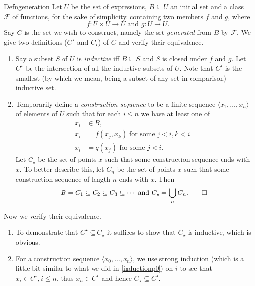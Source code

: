 \begin{reference}{Defn}{generation}
  Let $U$ be the set of expressions, $B\subseteq U$ an initial set and a class $\mathcal{F}$ of functions, for the sake of simplicity, containing two members $f$ and $g$, where
  \[
    f:U\times U\rightarrow U \text{ and } g:U\rightarrow U.
  \]
  Say $C$ is the set we wish to construct, namely the set \textit{generated} from $B$ by $\mathcal{F}$. We give two definitions ($C^\star$ and $C_\star$) of $C$ and verify their equivalence.
  \begin{enumerate}
    \item
          Say a subset $S$ of $U$ is \textit{inductive} iff $B\subseteq S$ and $S$ is closed under $f$ and $g$. Let $C^\star$ be the intersection of all the inductive subsets of $U$. Note that $C^\star$ is the smallest (by which we mean, being a subset of any set in comparison) inductive set.
    \item Temporarily define a \textit{construction sequence} to be a finite sequence $\langle x_1,\dots,x_n\rangle$ of elements of $U$ such that for each $i\leq n$ we have at least one of
          \begin{align*}
            x_i & \in B,                                    \\
            x_i & =f(x_j,x_k) \text{  for some  } j<i, k<i, \\
            x_i & =g(x_j) \text{  for some  } j<i.
          \end{align*}
          Let $C_\star$ be the set of points $x$ such that some construction sequence ends with $x$. To better describe this, let $C_n$ be the set of points $x$ such that some construction sequence of length $n$ ends with $x$. Then
          \[
            B=C_1\subseteq C_2\subseteq C_3\subseteq\cdots\text{ and } C_\star=\bigcup_{n} C_n.\qedhere
          \]
  \end{enumerate}
\end{reference}

Now we verify their equivalence.
\begin{enumerate}
  \item To demonstrate that $C^\star\subseteq C_\star$ it suffices to show that $C_\star$ is inductive, which is obvious.
  \item For a construction sequence $\langle x_0,\dots,x_n\rangle$, we use strong induction (which is a little bit similar to what we did in \ref{inductionp0}) on $i$ to see that $x_i\in C^\star, i\leq n$, thus $x_n\in C^\star$ and hence $C_\star\subseteq C^\star$.
\end{enumerate}

